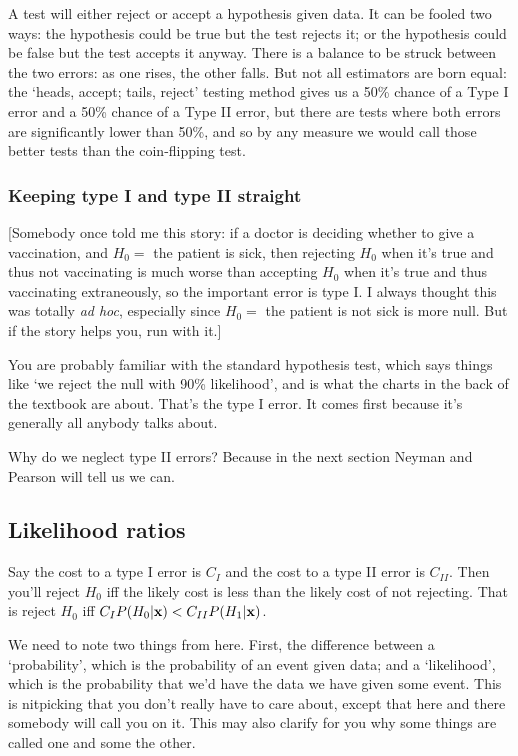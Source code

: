 A test will either reject or accept a hypothesis given data. It can be
fooled two ways: the hypothesis could be true but the test rejects it;
or the hypothesis could be false but the test accepts it anyway. There
is a balance to be struck between the two errors: as one rises, the
other falls. But not all estimators are born equal: the `heads, accept;
tails, reject' testing method gives us a 50\% chance of a Type I error
and a 50\% chance of a Type II error, but there are tests where both
errors are significantly lower than 50\%, and so by any measure we would
call those better tests than the coin-flipping test. 


\subsubsection{Keeping type I and type II straight} 
[Somebody once told me this story: if a doctor is deciding
whether to give a vaccination, and $H_0=$ the patient is sick,
then rejecting $H_0$ when it's true and thus not vaccinating is much worse than accepting
$H_0$ when it's true and thus vaccinating extraneously, so the important error is type I. I always
thought this was totally {\it ad hoc}, especially since $H_0=$
the patient is not sick is more null. But if the story helps you, run
with it.]

You are probably familiar with the
standard hypothesis test, which says things like `we reject the null with 90\%
likelihood', and is what the charts in the back of the textbook are about.
That's the type I error. It comes first because
it's generally all anybody talks about.

Why do we neglect type II errors? Because in the next section Neyman
and Pearson will tell us we can.

\subsection{Likelihood ratios} 

Say the cost to a type I error is $C_I$ and the cost to a type II error is $C_{II}$.
Then you'll reject $H_0$ iff the likely cost is less than the likely cost of not
rejecting. That is reject $H_0$ iff $C_I P(H_0|{\bf x})<C_{II} P(H_1|{\bf x})$.

We need to note two things from here. First, the difference between a `probability',
which is the probability of an event given data; and a `likelihood', which is the
probability that we'd have the data we have given some event. This is nitpicking that
you don't really have to care about, except that here and there somebody will call you
on it. This may also clarify for you why some things are called one and some the
other.

